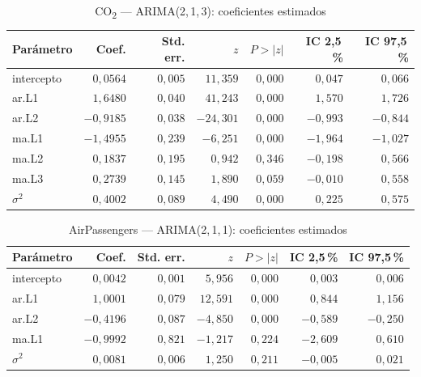 \documentclass[12pt, a4paper]{article}
\begin{document}
\begin{table}[H]
    \centering
    \caption{CO\textsubscript{2} — ARIMA(2,\,1,\,3): coeficientes estimados}
    \label{tab:coef_co2}
    \begin{tabular}{lrrrrrr}
        \toprule
        \textbf{Parámetro} & \textbf{Coef.} & \textbf{Std. err.} & \textbf{$z$} & \textbf{$P>|z|$} & \textbf{IC 2,5\,\%} & \textbf{IC 97,5\,\%} \\
        \midrule
        intercepto & $0{,}0564$  & $0{,}005$ &  $11{,}359$ & $0{,}000$ &  $0{,}047$ &  $0{,}066$ \\
        ar.L1      & $1{,}6480$  & $0{,}040$ &  $41{,}243$ & $0{,}000$ &  $1{,}570$ &  $1{,}726$ \\
        ar.L2      & $-0{,}9185$ & $0{,}038$ & $-24{,}301$ & $0{,}000$ & $-0{,}993$ & $-0{,}844$ \\
        ma.L1      & $-1{,}4955$ & $0{,}239$ &  $-6{,}251$ & $0{,}000$ & $-1{,}964$ & $-1{,}027$ \\
        ma.L2      & $0{,}1837$  & $0{,}195$ &   $0{,}942$ & $0{,}346$ & $-0{,}198$ &  $0{,}566$ \\
        ma.L3      & $0{,}2739$  & $0{,}145$ &   $1{,}890$ & $0{,}059$ & $-0{,}010$ &  $0{,}558$ \\
        $\sigma^2$ & $0{,}4002$  & $0{,}089$ &   $4{,}490$ & $0{,}000$ &  $0{,}225$ &  $0{,}575$ \\
        \bottomrule
    \end{tabular}
\end{table}

\begin{table}[H]
    \centering
    \caption{AirPassengers — ARIMA(2,\,1,\,1): coeficientes estimados}
    \label{tab:coef_air}
    \begin{tabular}{lrrrrrr}
        \toprule
        \textbf{Parámetro} & \textbf{Coef.} & \textbf{Std. err.} & \textbf{$z$} & \textbf{$P>|z|$} & \textbf{IC 2,5\,\%} & \textbf{IC 97,5\,\%} \\
        \midrule
        intercepto &  $0{,}0042$ & $0{,}001$ &  $5{,}956$ & $0{,}000$ &  $0{,}003$ &  $0{,}006$ \\
        ar.L1      &  $1{,}0001$ & $0{,}079$ & $12{,}591$ & $0{,}000$ &  $0{,}844$ &  $1{,}156$ \\
        ar.L2      & $-0{,}4196$ & $0{,}087$ & $-4{,}850$ & $0{,}000$ & $-0{,}589$ & $-0{,}250$ \\
        ma.L1      & $-0{,}9992$ & $0{,}821$ & $-1{,}217$ & $0{,}224$ & $-2{,}609$ &  $0{,}610$ \\
        $\sigma^2$ &  $0{,}0081$ & $0{,}006$ &  $1{,}250$ & $0{,}211$ & $-0{,}005$ &  $0{,}021$ \\
        \bottomrule
    \end{tabular}
\end{table}
\end{document}
